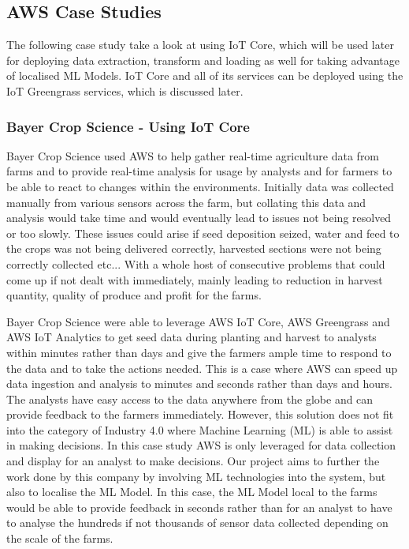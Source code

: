\subsection{AWS Case Studies}

The following case study take a look at using IoT Core, which will be used later for deploying data extraction, transform and loading as well for taking advantage of localised ML Models. IoT Core and all of its services can be deployed using the IoT Greengrass services, which is discussed later.

\subsubsection{Bayer Crop Science - Using IoT Core}
Bayer Crop Science used AWS to help gather real-time agriculture data from farms and to provide real-time analysis for usage by analysts and for farmers to be able to react to changes within the environments. \cite{ch1_2_case_study_1} Initially data was collected manually from various sensors across the farm, but collating this data and analysis would take time and would eventually lead to issues not being resolved or too slowly. These issues could arise if seed deposition seized, water and feed to the crops was not being delivered correctly, harvested sections were not being correctly collected etc... With a whole host of consecutive problems that could come up if not dealt with immediately, mainly leading to reduction in harvest quantity, quality of produce and profit for the farms.

Bayer Crop Science were able to leverage AWS IoT Core, AWS Greengrass and AWS IoT Analytics to get seed data during planting and harvest to analysts within minutes rather than days and give the farmers ample time to respond to the data and to take the actions needed. This is a case where AWS can speed up data ingestion and analysis to minutes and seconds rather than days and hours. The analysts have easy access to the data anywhere from the globe and can provide feedback to the farmers immediately. However, this solution does not fit into the category of Industry 4.0 where Machine Learning (ML) is able to assist in making decisions. In this case study AWS is only leveraged for data collection and display for an analyst to make decisions. Our project aims to further the work done by this company by involving ML technologies into the system, but also to localise the ML Model. In this case, the ML Model local to the farms would be able to provide feedback in seconds rather than for an analyst to have to analyse the hundreds if not thousands of sensor data collected depending on the scale of the farms.

